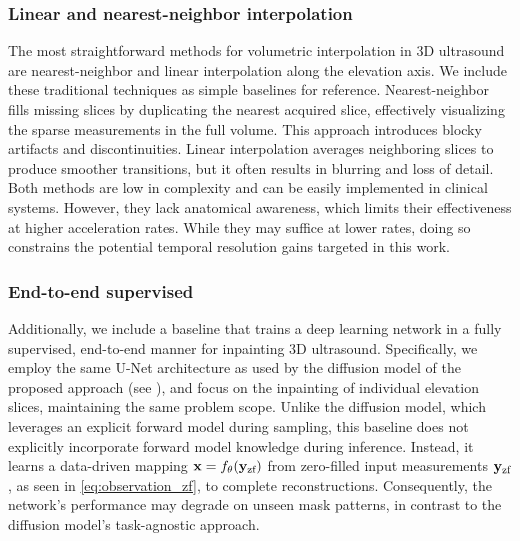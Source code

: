 \documentclass[journal,twoside,web,dvipsnames]{ieeecolor}          %
\begin{document}
\subsubsection{Linear and nearest-neighbor interpolation}
The most straightforward methods for volumetric interpolation in 3D ultrasound are nearest-neighbor and linear interpolation along the elevation axis. We include these traditional techniques as simple baselines for reference. Nearest-neighbor fills missing slices by duplicating the nearest acquired slice, effectively visualizing the sparse measurements in the full volume. This approach introduces blocky artifacts and discontinuities. Linear interpolation averages neighboring slices to produce smoother transitions, but it often results in blurring and loss of detail. Both methods are low in complexity and can be easily implemented in clinical systems. However, they lack anatomical awareness, which limits their effectiveness at higher acceleration rates. While they may suffice at lower rates, doing so constrains the potential temporal resolution gains targeted in this work.

\subsubsection{End-to-end supervised}
Additionally, we include a baseline that trains a deep learning network in a fully supervised, end-to-end manner for inpainting 3D ultrasound. Specifically, we employ the same \mbox{U-Net} architecture as used by the diffusion model of the proposed approach (see ), and focus on the inpainting of individual elevation slices, maintaining the same problem scope. Unlike the diffusion model, which leverages an explicit forward model during sampling, this baseline does not explicitly incorporate forward model knowledge during inference. Instead, it learns a data-driven mapping ${\mathbf{x}} = f_\theta({\mathbf{y}}_{\text{zf}})$ from zero-filled input measurements ${\mathbf{y}}_{\text{zf}}$, as seen in \eqref{eq:observation_zf}, to complete reconstructions. Consequently, the network’s performance may degrade on unseen mask patterns, in contrast to the diffusion model’s task-agnostic approach.
\end{document}

